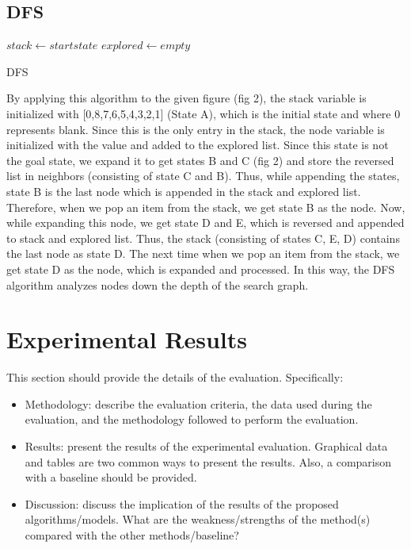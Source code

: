 \documentclass{svproc}
\begin{document}
\subsection{DFS}

\begin{algorithm}[H]
	\SetAlgoLined
	$stack \gets start state$\;
	$explored \gets empty$\;
	\caption{DFS}
\end{algorithm}

\noindent By applying this algorithm to the given figure (fig 2), the stack variable is initialized with [0,8,7,6,5,4,3,2,1] (State A), which is the initial state and where 0 represents blank. Since this is the only entry in the stack, the node variable is initialized with the value and added to the explored list. Since this state is not the goal state, we expand it to get states B and C (fig 2) and store the reversed list in neighbors (consisting of state C and B). Thus, while appending the states, state B is the last node which is appended in the stack and explored list. Therefore, when we pop an item from the stack, we get state B as the node. Now, while expanding this node, we get state D and E, which is reversed and appended to stack and explored list. Thus, the stack (consisting of states C, E, D) contains the last node as state D. The next time when we pop an item from the stack, we get state D as the node, which is expanded and processed. In this way, the DFS algorithm analyzes nodes down the depth of the search graph.

\section{Experimental Results}
This section should provide the details of the evaluation. Specifically:
\begin{itemize}
\item Methodology: describe the evaluation criteria, the data used during the evaluation, and the methodology followed to perform the evaluation. 
\item Results: present the results of the experimental evaluation. Graphical data and tables are two common ways to present the results. Also, a comparison with a baseline should be provided.
\item Discussion: discuss the implication of the results of the proposed algorithms/models. What are the weakness/strengths of the method(s) compared with the other methods/baseline?
\end{itemize}
\end{document}
